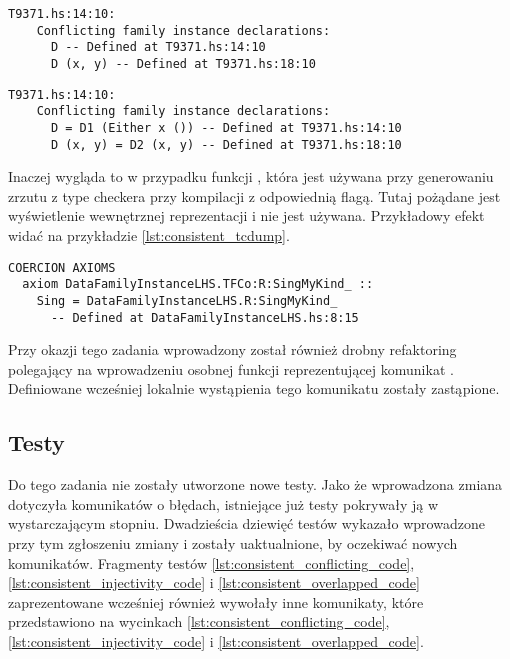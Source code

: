 \begin{lstlisting}[float,language={},label={lst:consistent_datafams_before},
                   caption={Błąd generowany przez kompilator w przypadku \ref{lst:consistent_datafams_before} przed wprowadzeniem zmian.}]
T9371.hs:14:10:
    Conflicting family instance declarations:
      D -- Defined at T9371.hs:14:10
      D (x, y) -- Defined at T9371.hs:18:10
\end{lstlisting}

\begin{lstlisting}[float,language={},label={lst:consistent_datafams_after},
                   caption={Błąd generowany przez kompilator w przypadku \ref{lst:consistent_datafams_after} przed wprowadzeniem zmian.}]
T9371.hs:14:10:
    Conflicting family instance declarations:
      D = D1 (Either x ()) -- Defined at T9371.hs:14:10
      D (x, y) = D2 (x, y) -- Defined at T9371.hs:18:10
\end{lstlisting}

Inaczej wygląda to w przypadku funkcji , która jest używana
przy generowaniu zrzutu z type checkera przy kompilacji z odpowiednią
flagą. Tutaj pożądane jest wyświetlenie wewnętrznej reprezentacji i
 nie jest używana. Przykładowy efekt widać na przykładzie
\ref{lst:consistent_tcdump}.

\begin{lstlisting}[float,language={},label={lst:consistent_tcdump},
                   caption={Fragment oczekiwanego zrzutu z type checkera testu DataFamilyInstanceLHS z wyświetlonym równaniem rodziny typów danych.}]
COERCION AXIOMS
  axiom DataFamilyInstanceLHS.TFCo:R:SingMyKind_ ::
    Sing = DataFamilyInstanceLHS.R:SingMyKind_
      -- Defined at DataFamilyInstanceLHS.hs:8:15
\end{lstlisting}

Przy okazji tego zadania wprowadzony został również drobny refaktoring polegający na wprowadzeniu osobnej funkcji  reprezentującej komunikat . Definiowane wcześniej lokalnie wystąpienia tego komunikatu zostały zastąpione.

\subsection{Testy} %

Do tego zadania nie zostały utworzone nowe testy. Jako że wprowadzona zmiana
dotyczyła komunikatów o błędach, istniejące już testy pokrywały ją w
wystarczającym stopniu. Dwadzieścia dziewięć testów wykazało wprowadzone przy
tym zgłoszeniu zmiany i zostały uaktualnione, by oczekiwać nowych
komunikatów. Fragmenty testów \ref{lst:consistent_conflicting_code},
\ref{lst:consistent_injectivity_code} i \ref{lst:consistent_overlapped_code}
zaprezentowane wcześniej również wywołały inne komunikaty, które przedstawiono
na wycinkach \ref{lst:consistent_conflicting_code},
\ref{lst:consistent_injectivity_code} i \ref{lst:consistent_overlapped_code}.

